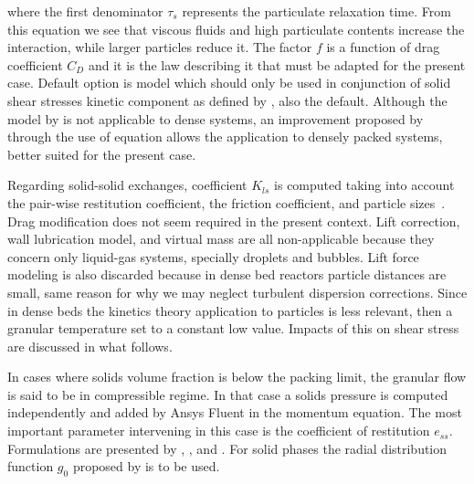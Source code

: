 \noindent{}where the first denominator $\tau_{s}$ represents the particulate relaxation time. From this equation we see that viscous fluids and high particulate contents increase the interaction, while larger particles reduce it. The factor $f$ is a function of drag coefficient $C_{D}$ and it is the law describing it that must be adapted for the present case. Default option is \textcite{Syamlal1989} model which should only be used in conjunction of solid shear stresses kinetic component as defined by \textcite{Syamlal1993}, also the default. Although the model by \textcite{Wen1966} is not applicable to dense systems, an improvement proposed by \textcite{Gidaspow1992} through the use of \textcite{Ergun1952} equation allows the application to densely packed systems, better suited for the present case.

Regarding solid-solid exchanges, coefficient $K_{ls}$ is computed taking into account the pair-wise restitution coefficient, the friction coefficient, and particle sizes~\cite{Syamlal1987b}. Drag modification does not seem required in the present context. Lift correction, wall lubrication model, and virtual mass are all non-applicable because they concern only liquid-gas systems, specially droplets and bubbles. Lift force modeling is also discarded because in dense bed reactors particle distances are small, same reason for why we may neglect turbulent dispersion corrections. Since in dense beds the kinetics theory application to particles is less relevant, then a granular temperature set to a constant low value. Impacts of this on shear stress are discussed in what follows.

In cases where solids volume fraction is below the packing limit, the granular flow is said to be in compressible regime. In that case a solids pressure is computed independently and added by Ansys Fluent in the momentum equation. The most important parameter intervening in this case is the coefficient of restitution $e_{ss}$. Formulations are presented by \textcite{Gidaspow1994}, \textcite{Syamlal1993}, and \textcite{Ahmadi1990}. For solid phases the radial distribution function $g_{0}$ proposed by \textcite{Gidaspow1994} is to be used.

